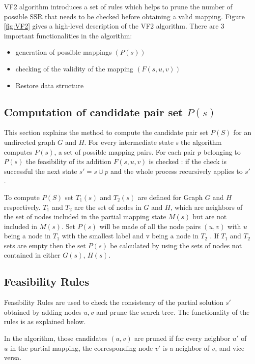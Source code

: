 VF2 algorithm introduces a set of rules which helps to prune the number of possible SSR that needs to be checked before obtaining a valid mapping. Figure \ref{fig:VF2} gives a high-level description of the VF2 algorithm. There are 3 important functionalities in the algorithm: 
\begin{itemize}
\item generation of possible mappings $(P(s))$
\item checking of the validity of the mapping $(F(s,u,v))$
\item Restore data structure
\end{itemize}



\subsection{Computation of candidate pair set $P(s)$}
This section explains the method to compute the candidate pair set $P(S)$ for an undirected graph $G$ and $H$. 
For every intermediate state s the algorithm computes $P(s)$, a set of possible mapping pairs. For each pair $p$ belonging to $P(s)$ the feasibility of its addition $F(s,u,v)$ is checked : if the check is successful the next state $s' = s \cup p$ and the whole process recursively applies to $s'$.

To compute $P(S)$ set $T_1(s)$ and $T_2(s)$ are defined for Graph $G$ and $H$ respectively. $T_1$ and $T_2$ are the set of  nodes in $G$ and $H$, which are neighbors of the set of nodes included in the partial mapping state $M(s)$ but are not included in $M(s)$.
Set $P(s)$ will be made of all the node pairs $(u,v)$ with $u$ being a node in $T_1$ with the smallest label  and v being a node in $T_2$ . If  $T_1$ and $T_2$ sets are empty then the set $P(s)$ be calculated by using the sets of nodes not contained in either $G(s)$, $H(s)$.

\subsection{Feasibility Rules}
Feasibility Rules are used to check the consistency of the partial solution $s'$ obtained by adding nodes $u,v$ and prune the search tree. The functionality of the rules is as explained below.

In the algorithm, those candidates $(u,v)$ are pruned if for every neighbor $u'$ of $u$ in the partial mapping, the corresponding node $v'$ is a neighbor of $v$, and vice versa.


